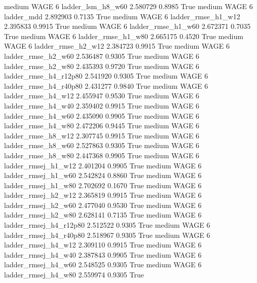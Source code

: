     medium     WAGE                 6      ladder_lsm_h8_w60   2.580729      0.8985    True
    medium     WAGE                 6             ladder_mdd   2.892903      0.7135    True
    medium     WAGE                 6     ladder_rmse_h1_w12   2.395833      0.9915    True
    medium     WAGE                 6     ladder_rmse_h1_w60   2.672371      0.7035    True
    medium     WAGE                 6     ladder_rmse_h1_w80   2.665175      0.4520    True
    medium     WAGE                 6     ladder_rmse_h2_w12   2.384723      0.9915    True
    medium     WAGE                 6     ladder_rmse_h2_w60   2.536487      0.9305    True
    medium     WAGE                 6     ladder_rmse_h2_w80   2.435393      0.9720    True
    medium     WAGE                 6  ladder_rmse_h4_r12p80   2.541920      0.9305    True
    medium     WAGE                 6  ladder_rmse_h4_r40p80   2.431277      0.9840    True
    medium     WAGE                 6     ladder_rmse_h4_w12   2.455947      0.9530    True
    medium     WAGE                 6     ladder_rmse_h4_w40   2.359402      0.9915    True
    medium     WAGE                 6     ladder_rmse_h4_w60   2.435090      0.9905    True
    medium     WAGE                 6     ladder_rmse_h4_w80   2.472206      0.9445    True
    medium     WAGE                 6     ladder_rmse_h8_w12   2.307745      0.9915    True
    medium     WAGE                 6     ladder_rmse_h8_w60   2.527863      0.9305    True
    medium     WAGE                 6     ladder_rmse_h8_w80   2.447368      0.9905    True
    medium     WAGE                 6    ladder_rmsej_h1_w12   2.401204      0.9905    True
    medium     WAGE                 6    ladder_rmsej_h1_w60   2.542824      0.8860    True
    medium     WAGE                 6    ladder_rmsej_h1_w80   2.702692      0.1670    True
    medium     WAGE                 6    ladder_rmsej_h2_w12   2.365819      0.9915    True
    medium     WAGE                 6    ladder_rmsej_h2_w60   2.477040      0.9530    True
    medium     WAGE                 6    ladder_rmsej_h2_w80   2.628141      0.7135    True
    medium     WAGE                 6 ladder_rmsej_h4_r12p80   2.512522      0.9305    True
    medium     WAGE                 6 ladder_rmsej_h4_r40p80   2.518967      0.9305    True
    medium     WAGE                 6    ladder_rmsej_h4_w12   2.309110      0.9915    True
    medium     WAGE                 6    ladder_rmsej_h4_w40   2.387843      0.9905    True
    medium     WAGE                 6    ladder_rmsej_h4_w60   2.548525      0.9305    True
    medium     WAGE                 6    ladder_rmsej_h4_w80   2.559974      0.9305    True
